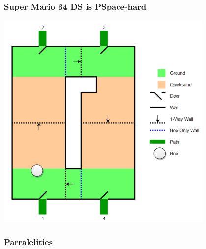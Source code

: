 \documentclass{beamer}
\begin{document}
\begin{frame}
  \frametitle{Super Mario 64 DS is PSpace-hard}
  \includegraphics[width=0.8\textwidth]{res/Super Mario 64.png}
\end{frame}

\begin{frame}
  \frametitle{Parralelities}
\end{frame}
\end{document}
